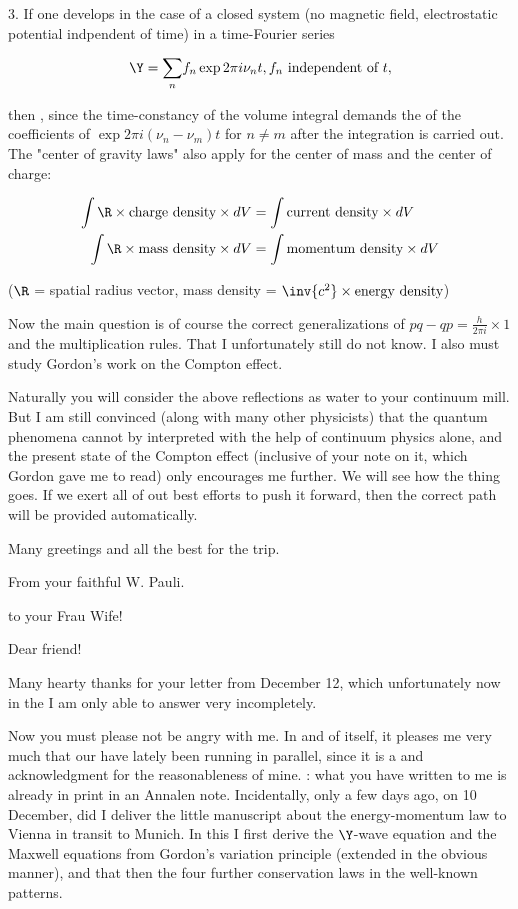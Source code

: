 \documentclass{article}
\newcommand{\uequ}[1]{
\begin{align*}
#1
\end{align*}
}
\newcommand{\sumX}[1]{\underset{#1}{\sum}}
\begin{document}
3. If one develops in the case of a closed system (no magnetic field, electrostatic potential indpendent of time) in a time-Fourier series
\uequ{
\Y = \sumX{n}f_n \exp{2\pi i \nu_n t}, \text{$f_n$ independent of $t$},
}
then , since the time-constancy of the volume integral demands the  of the coefficients of $\exp{2\pi i(\nu_n - \nu_m)t}$ for $n \neq m$ after the integration is carried out. The "center of gravity laws" also apply for the center of mass and the center of charge:
\uequ{
\int\R\times\text{charge density}\times dV &= \int\text{current density}\times dV\\
\int\R\times\text{mass density}\times dV &= \int\text{momentum density}\times dV
}
($\R$ = spatial radius vector, mass density = $\inv{c^2}\times\text{energy density}$)

Now the main question is of course the correct generalizations of $pq-qp=\frac{h}{2\pi i}\times 1$ and the multiplication rules. That I unfortunately still do not know. I also must study Gordon's work on the Compton effect.

Naturally you will consider the above reflections as water to your continuum mill. But I am still convinced (along with many other physicists) that the quantum phenomena cannot by interpreted with the help of continuum physics alone, and the present state of the Compton effect (inclusive of your note on it, which Gordon gave me to read) only encourages me further. We will see how the thing goes. If we exert all of out best efforts to push it forward, then the correct path will be provided automatically.

Many greetings and all the best for the trip.

From your faithful W. Pauli.

 to your Frau Wife!

\date{December 15, 1926}

Dear friend!

Many hearty thanks for your  letter from December 12, which unfortunately now in the  I am only able to answer very incompletely.

Now you must please not be angry with me. In and of itself, it pleases me very much that our  have lately been running in parallel, since it is a  and acknowledgment for the reasonableness of mine. : what you have written to me is already in print in an Annalen note. Incidentally, only a few days ago, on 10 December, did I deliver the little manuscript about the energy-momentum law to Vienna in transit to Munich. In this I first derive the $\Y$-wave equation and the Maxwell equations from Gordon's variation principle (extended in the obvious manner), and that then  the four further conservation laws in the well-known patterns.
\end{document}
